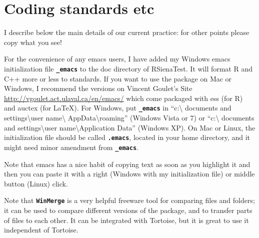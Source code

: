 \documentclass[12pt, a4paper]{article}
\renewcommand{\=}{\,=\,}
\newcommand{\+}{\,+\,}
\newcommand{\sfn}[1]{\textbf{\texttt{#1}}}
\begin{document}
\section{Coding standards etc}

I describe below the main details of our current practice: for other points
please copy what you see!

For the convenience of any emacs users, I have added my Windows emacs
initialization file \sfn{\_emacs} to the doc directory of RSienaTest. It will
format R and C++ more or less to standards. If you want to use the package on
Mac or Windows, I recommend the versions on Vincent Goulet's Site
\url{http://vgoulet.act.ulaval.ca/en/emacs/} which come packaged with ess (for
R) and auctex (for \LaTeX). For Windows, put \sfn{\_emacs} in ``c:\textbackslash
documents and settings\textbackslash user name\textbackslash
AppData\textbackslash roaming'' (Windows Vista or 7) or ``c:\textbackslash
documents and settings\textbackslash user name\textbackslash Application Data''
(Windows XP). On Mac or Linux, the initialization file should be called
\sfn{.emacs}, located in your home directory, and it might need minor amendment
from \sfn{\_emacs}.

Note that emacs has a nice habit of copying text as soon as you highlight it and
then you can paste it with a right (Windows with my initialization file) or
middle button (Linux) click.

Note that \sfn{WinMerge} is a very helpful freeware tool for comparing files and folders;
it can be used to compare different versions of the package,
and to transfer parts of files to each other.
It can be integrated with Tortoise, but it is great to use it
independent of Tortoise.
\end{document}
